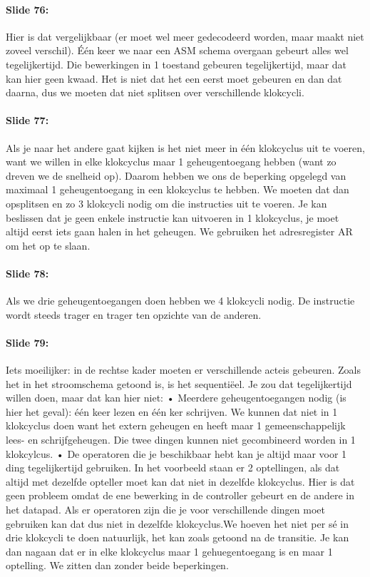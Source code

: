 \documentclass[10pt,a4paper]{book}
\begin{document}
\paragraph{Slide 76:} Hier is dat vergelijkbaar (er moet wel meer gedecodeerd worden, maar maakt niet zoveel verschil). É\'en keer we naar een ASM schema overgaan gebeurt alles wel tegelijkertijd. Die bewerkingen in 1 toestand gebeuren tegelijkertijd, maar dat kan hier geen kwaad. Het is niet dat het een eerst moet gebeuren en dan dat daarna, dus we moeten dat niet splitsen over verschillende klokcycli.

\paragraph{Slide 77:} Als je naar het andere gaat kijken is het niet meer in \'e\'en klokcyclus uit te voeren, want we willen in elke klokcyclus maar 1 geheugentoegang hebben (want zo dreven we de snelheid op). Daarom hebben we ons de beperking opgelegd van maximaal 1 geheugentoegang in een klokcyclus te hebben. We moeten dat dan opsplitsen en zo 3 klokcycli nodig om die instructies uit te voeren. Je kan beslissen dat je geen enkele instructie kan uitvoeren in 1 klokcyclus, je moet altijd eerst iets gaan halen in het geheugen. We gebruiken het adresregister AR om het op te slaan.

\paragraph{Slide 78:} Als we drie geheugentoegangen doen hebben we 4 klokcycli nodig. De instructie wordt steeds trager en trager ten opzichte van de anderen.

\paragraph{Slide 79:} Iets moeilijker: in de rechtse kader moeten er verschillende acteis gebeuren. Zoals het in het stroomschema getoond is, is het sequenti\"eel. Je zou dat tegelijkertijd willen doen, maar dat kan hier niet:	• Meerdere geheugentoegangen nodig (is hier het geval): \'e\'en keer lezen en \'e\'en ker schrijven. We kunnen dat niet in 1 klokcyclus doen want het extern geheugen en heeft maar 1 gemeenschappelijk lees- en schrijfgeheugen. Die twee dingen kunnen niet gecombineerd worden in 1 klokcylcus.	• De operatoren die je beschikbaar hebt kan je altijd maar voor 1 ding tegelijkertijd gebruiken. In het voorbeeld staan er 2 optellingen, als dat altijd met dezelfde opteller moet kan dat niet in dezelfde klokcyclus. Hier is dat geen probleem omdat de ene bewerking in de controller gebeurt en de andere in het datapad. Als er operatoren zijn die je voor verschillende dingen moet gebruiken kan dat dus niet in dezelfde klokcyclus.We hoeven het niet per s\'e in drie klokcycli te doen natuurlijk, het kan zoals getoond na de transitie. Je kan dan nagaan dat er in elke klokcyclus maar 1 gehuegentoegang is en maar 1 optelling. We zitten dan zonder beide beperkingen. 
\end{document}
